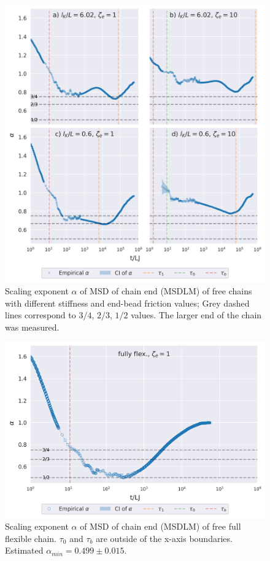 \documentclass[
    paper=A4,pagesize=automedia,fontsize=12pt,
    BCOR=15mm,DIV=22,
    twoside,headinclude,footinclude=false,
    fleqn,             %
    bibliography=totocnumbered,          %
    listof=totoc,                %
    listof=flat,                 %
    cleardoublepage=empty      %
    numbers=endperiod
]{scrartcl}
\begin{document}
\begin{figure}[H]
    \centering
    \includegraphics[width=\textwidth]{17+18+19+20-exp-alpha.png}
    \caption{Scaling exponent $\alpha$ of MSD of chain end (MSDLM) 
    of free chains with different stiffness and end-bead friction values;
    Grey dashed lines correspond to $3/4$, $2/3$, $1/2$ values.
    The larger end of the chain was measured. 
    }
    \label{fig:alpha_free}
\end{figure}

\begin{figure}[H]
    \centering
    \includegraphics[width=\textwidth]{17+18+19+20-exp-full-flex-alpha.png}
    \caption{Scaling exponent $\alpha$ of MSD of chain end (MSDLM) 
    of free full flexible chain. $\tau_0$ and $\tau_b$ are outside of the
    x-axis boundaries. Estimated $\alpha_{min}=0.499 \pm 0.015$.
    }
    \label{fig:alpha_free_full_flex}
\end{figure}
\end{document}
